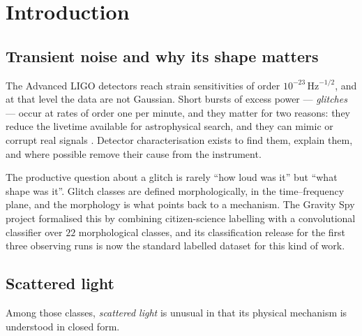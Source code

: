 \section{Introduction}
\label{sec:introduction}

\subsection{Transient noise and why its shape matters}

The Advanced LIGO detectors \citep{AdvancedLIGO2015} reach strain sensitivities
of order $10^{-23}\,\mathrm{Hz}^{-1/2}$, and at that level the data are not
Gaussian. Short bursts of excess power --- \emph{glitches} --- occur at rates
of order one per minute, and they matter for two reasons: they reduce the
livetime available for astrophysical search, and they can mimic or corrupt real
signals \citep{Davis2021}. Detector characterisation exists to find them,
explain them, and where possible remove their cause from the instrument.

The productive question about a glitch is rarely ``how loud was it'' but
``what shape was it''. Glitch classes are defined morphologically, in the
time--frequency plane, and the morphology is what points back to a mechanism.
The Gravity Spy project \citep{Zevin2017,Glanzer2023} formalised this by
combining citizen-science labelling with a convolutional classifier over
$22$ morphological classes, and its classification release for the first three
observing runs is now the standard labelled dataset for this kind of work.

\subsection{Scattered light}

Among those classes, \emph{scattered light} is unusual in that its physical
mechanism is understood in closed form.

